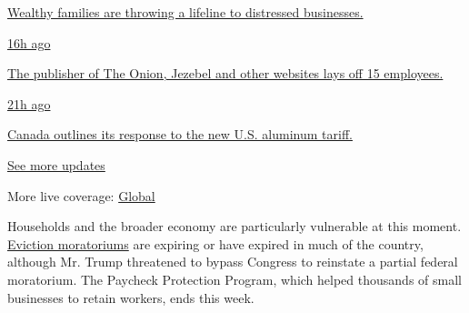 \href{https://www.nytimes.com/live/2020/08/07/business/stock-market-today-coronavirus?action=click\&pgtype=Article\&state=default\&region=MAIN_CONTENT_1\&context=storylines_live_updates\#wealthy-families-are-throwing-a-lifeline-to-distressed-businesses}{Wealthy
families are throwing a lifeline to distressed businesses.}

\href{https://www.nytimes.com/live/2020/08/07/business/stock-market-today-coronavirus?action=click\&pgtype=Article\&state=default\&region=MAIN_CONTENT_1\&context=storylines_live_updates\#the-publisher-of-the-onion-jezebel-and-other-websites-lays-off-15-employees}{16h
ago}

\href{https://www.nytimes.com/live/2020/08/07/business/stock-market-today-coronavirus?action=click\&pgtype=Article\&state=default\&region=MAIN_CONTENT_1\&context=storylines_live_updates\#the-publisher-of-the-onion-jezebel-and-other-websites-lays-off-15-employees}{The
publisher of The Onion, Jezebel and other websites lays off 15
employees.}

\href{https://www.nytimes.com/live/2020/08/07/business/stock-market-today-coronavirus?action=click\&pgtype=Article\&state=default\&region=MAIN_CONTENT_1\&context=storylines_live_updates\#canada-outlines-its-response-to-the-new-us-aluminum-tariff}{21h
ago}

\href{https://www.nytimes.com/live/2020/08/07/business/stock-market-today-coronavirus?action=click\&pgtype=Article\&state=default\&region=MAIN_CONTENT_1\&context=storylines_live_updates\#canada-outlines-its-response-to-the-new-us-aluminum-tariff}{Canada
outlines its response to the new U.S. aluminum tariff.}

\href{https://www.nytimes.com/live/2020/08/07/business/stock-market-today-coronavirus?action=click\&pgtype=Article\&state=default\&region=MAIN_CONTENT_1\&context=storylines_live_updates}{See
more updates}

More live coverage:
\href{https://www.nytimes.com/2020/08/07/world/covid-19-news.html?action=click\&pgtype=Article\&state=default\&region=MAIN_CONTENT_1\&context=storylines_live_updates}{Global}

Households and the broader economy are particularly vulnerable at this
moment.
\href{https://www.nytimes.com/2020/08/07/business/economy/housing-economy-eviction-renters.html}{Eviction
moratoriums} are expiring or have expired in much of the country,
although Mr. Trump threatened to bypass Congress to reinstate a partial
federal moratorium. The Paycheck Protection Program, which helped
thousands of small businesses to retain workers, ends this week.

